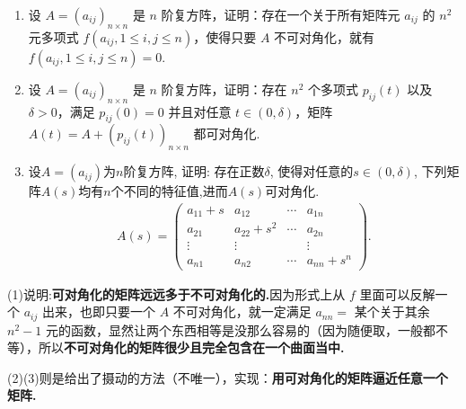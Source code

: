 \documentclass[../../main.tex]{subfiles}
\begin{document}
\begin{proposition}[不可对角化矩阵的摄动]\label{proposition:不可对角化矩阵的摄动}
\begin{enumerate}[(1)]
\item 设 $A = (a_{ij})_{n\times n}$ 是 $n$ 阶复方阵，证明：存在一个关于所有矩阵元 $a_{ij}$ 的 $n^2$ 元多项式 $f(a_{ij}, 1\leqslant  i, j\leqslant  n)$，使得只要 $A$ 不可对角化，就有 $f(a_{ij}, 1\leqslant  i, j\leqslant  n)=0$.

\item 设 $A = (a_{ij})_{n\times n}$ 是 $n$ 阶复方阵，证明：存在 $n^2$ 个多项式 $p_{ij}(t)$ 以及 $\delta > 0$，满足 $p_{ij}(0)=0$ 并且对任意 $t\in(0, \delta)$，矩阵 $A(t)=A + (p_{ij}(t))_{n\times n}$ 都可对角化. 

\item 设\(A = (a_{ij})\)为\(n\)阶复方阵, 证明: 存在正数\(\delta\), 使得对任意的\(s \in (0,\delta)\), 下列矩阵$A(s)$均有\(n\)个不同的特征值,进而$A(s)$可对角化.
\begin{align*}
A(s)= 
\begin{pmatrix}
a_{11}+s & a_{12} & \cdots & a_{1n}\\
a_{21} & a_{22}+s^{2} & \cdots & a_{2n}\\
\vdots & \vdots & & \vdots\\
a_{n1} & a_{n2} & \cdots & a_{nn}+s^{n}
\end{pmatrix}.
\end{align*}
\end{enumerate}
\end{proposition}
\begin{remark}
(1)说明:\textbf{可对角化的矩阵远远多于不可对角化的.}因为形式上从 $f$ 里面可以反解一个 $a_{ij}$ 出来，也即只要一个 $A$ 不可对角化，就一定满足 $a_{nn} =$ 某个关于其余 $n^2 - 1$ 元的函数，显然让两个东西相等是没那么容易的（因为随便取，一般都不等），所以\textbf{不可对角化的矩阵很少且完全包含在一个曲面当中.}

(2)(3)则是给出了摄动的方法（不唯一），实现：\textbf{用可对角化的矩阵逼近任意一个矩阵.} 
\end{remark}
\end{document}
